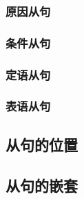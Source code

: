 \subsubsection*{原因从句}

\subsubsection*{条件从句}

\subsubsection{定语从句}

\subsubsection{表语从句}

\subsection{从句的位置}


\subsection{从句的嵌套}